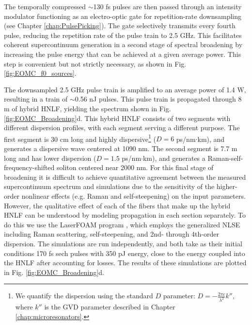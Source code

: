 The temporally compressed $\sim$130 fs pulses are then passed through an intensity modulator functioning as an electro-optic gate for repetition-rate downsampling (see Chapter \ref{chap:PulsePicking}). The gate selectively transmits every fourth pulse, reducing the repetition rate of the pulse train to 2.5 GHz. This facilitates coherent supercontinuum generation in a second stage of spectral broadening by increasing the pulse energy that can be achieved at a given average power. This step is convenient but not strictly necessary, as shown in Fig. \ref{fig:EOMC_f0_sources}. 

The downsampled 2.5 GHz pulse train is amplified to an average power of 1.4 W, resulting in a train of $\sim$0.56 nJ pulses. This pulse train is propagated through 8 m of hybrid HNLF, yielding the spectrum shown in Fig. \ref{fig:EOMC_Broadening}d. This hybrid HNLF consists of two segments with different dispersion profiles, with each segment serving a different purpose. The first segment is 30 cm long and highly dispersive\footnote{We quantify the dispersion using the standard $D$ parameter: $D=-\frac{2\pi c}{\lambda^2} k''$, where $k''$ is the GVD parameter described in Chapter \ref{chap:microresonators}.} ($D=6$  ps/nm$\cdot$km), and generates a dispersive wave centered at 1090 nm. The second segment is 7.7 m long and has lower dispersion ($D=1.5$  ps/nm$\cdot$km), and generates a Raman-self-frequency-shifted soliton centered near 2000 nm. For this final stage of broadening it is difficult to achieve quantitative agreement between the measured supercontinuum spectrum and simulations due to the sensitivity of the higher-order nonlinear effects (e.g. Raman and self-steepening) on the input parameters. However, the qualitative effect of each of the fibers that make up the hybrid HNLF can be understood by modeling propagation in each section separately. To do this we use the LaserFOAM program \cite{Amorim2009}, which employs the generalized NLSE including Raman scattering, self-steepening, and 2nd- through 4th-order dispersion. The simulations are run independently, and both take as their initial conditions 170 fs sech pulses with 350 pJ energy, close to the energy coupled into the HNLF after accounting for losses. The results of these simulations are plotted in Fig. \ref{fig:EOMC_Broadening}d. 




